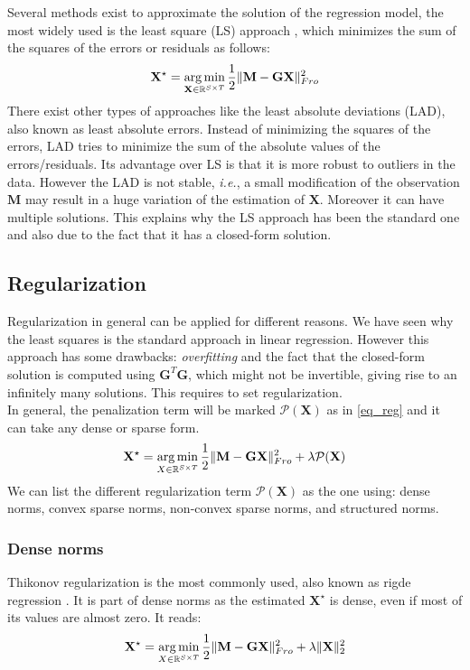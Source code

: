 Several methods exist to approximate the solution of the regression model, the most widely used is the least square (LS) approach \cite{legendre1805nouvelles}, which minimizes the sum of the squares of the errors or residuals as follows:
\begin{equation} \label{eq_ls}
	\mathbf{X^\star} = \mathop{\mathrm{arg}\,\mathrm{min}}_{\mathbf{X}\in \mathbb{R}^{S\times T}}\frac{1}{2} \|\mathbf{M}-\mathbf{GX}\|_{Fro}^2
\end{equation}
There exist other types of approaches like the least absolute deviations (LAD), also known as least absolute errors. Instead of minimizing the squares of the errors, LAD tries to minimize the sum of the absolute values of the errors/residuals. Its advantage over LS is that it is more robust to outliers in the data. However the LAD is not stable, \textit{i.e.}, a small modification of the observation $\mathbf{M}$ may result in a huge variation of the estimation of $\mathbf{X}$. Moreover it can have multiple solutions. This explains why the LS approach has been the standard one and also due to the fact that it has a closed-form solution.

\subsection{Regularization}

Regularization in general can be applied for different reasons. We have seen why the least squares is the standard approach in linear regression. However this approach has some drawbacks: \textit{overfitting} and the fact that the closed-form solution is computed using $\mathbf{G}^T\mathbf{G}$, which might not be invertible, giving rise to an infinitely many solutions. This requires to set regularization.\\

In general, the penalization term will be marked $\mathcal{P}(\mathbf{X})$ as in \ref{eq_reg} and it can take any dense or sparse form.
\begin{equation} \label{eq_reg}
	\mathbf{X}^\star = \mathop{\mathrm{arg}\,\mathrm{min}}_{X\in\mathbb{R}^{S\times T}}\frac{1}{2}\|\mathbf{M}-\mathbf{GX}\|_{Fro}^2 + \lambda\mathcal{P}(\mathbf{X})
\end{equation}
We can list the different regularization term $\mathcal{P}(\mathbf{X})$ as the one using: dense norms, convex sparse norms, non-convex sparse norms, and structured norms.

\subsubsection*{Dense norms}
Thikonov regularization \cite{tikhonov1977solutions} is the most commonly used, also known as rigde regression \cite{hoerl1970ridge}. It is part of dense norms as the estimated $\mathbf{X}^\star$ is dense, even if most of its values are almost zero. It reads:
\begin{equation} \label{eq_thikonov}
	\mathbf{X}^\star = \mathop{\mathrm{arg}\,\mathrm{min}}_{X\in\mathbb{R}^{S\times T}}\frac{1}{2}\|\mathbf{M}-\mathbf{GX}\|_{Fro}^2 + \lambda\|\mathbf{X}\|_2^2
\end{equation}

